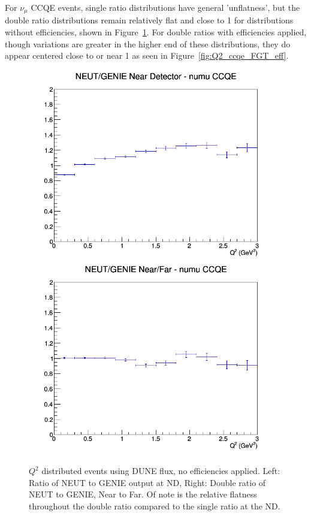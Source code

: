 \documentclass[12pt]{article}
\begin{document}
For $\nu_{\mu}$ CCQE events, single ratio distributions have general 'unflatness', but the double ratio distributions remain relatively flat and close to 1 for distributions without efficiencies, shown in Figure~\ref{fig:Q2_ccqe_no_eff}. For double ratios with efficiencies applied, though variations are greater in the higher end of these distributions, they do appear centered close to or near 1 as seen in Figure~\ref{fig:Q2_ccqe_FGT_eff}. 
\begin{figure}[h]
\includegraphics[width=\linewidth]{Q2/nominal/ratios/CCQE_NEUT_GENIE_numu_near_Q2.png}
\endminipage
{}
\includegraphics[width=\linewidth]{Q2/nominal/ratios/CCQE_NEUT_GENIE_numu_NF_Q2.png}
\endminipage
\caption{$Q^2$ distributed events using DUNE flux, no efficiencies applied. Left: Ratio of NEUT to GENIE output at ND, Right: Double ratio of NEUT to GENIE, Near to Far. Of note is the relative flatness throughout the double ratio compared to the single ratio at the ND.}
\label{fig:Q2_ccqe_no_eff}
\end{figure}
\end{document}
